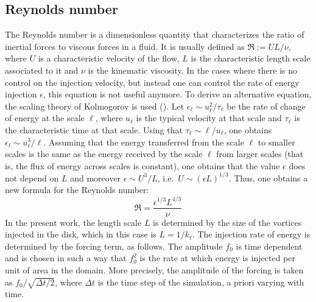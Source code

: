 \documentclass[../main.tex]{subfiles}
\begin{document}
\subsection{Reynolds number}
The Reynolds number is a dimensionless quantity that characterizes the ratio of inertial forces to viscous forces in a fluid. It is usually defined as $\Re:= U L/\nu$, where $U$ is a characteristic velocity of the flow, $L$ is the characteristic length scale associated to it and $\nu$ is the kinematic viscosity. In the cases where there is no control on the injection velocity, but instead one can control the rate of energy injection $\epsilon$, this equation is not useful anymore. To derive an alternative equation, the scaling theory of Kolmogorov is used (\cite{Frisch}). Let $\epsilon_\ell \sim u_\ell^2 / \tau_\ell$ be the rate of change of energy at the scale $\ell$, where $u_\ell$ is the typical velocity at that scale and $\tau_\ell$ is the characteristic time at that scale. Using that $\tau_\ell\sim \ell/u_\ell$, one obtains $\epsilon_\ell \sim u_\ell^3/\ell$. Assuming that the energy transferred from the scale $\ell$ to smaller scales is the same as the energy received by the scale $\ell$ from larger scales (that is, the flux of energy across scales is constant), one obtains that the value $\epsilon$ does not depend on $L$ and moreover $\epsilon \sim U^3/L$, i.e.\ $U \sim {(\epsilon L)}^{1/3}$. Thus, one obtains a new formula for the Reynolds number:
\begin{equation}
	\Re=\frac{\epsilon^{1/3} L^{4/3}}{\nu}
\end{equation}
In the present work, the length scale $L$ is determined by the size of the vortices injected in the disk, which in this case is $L=1/k_\ell$. The injection rate of energy is determined by the forcing term, as follows. The amplitude $f_0$ is time dependent and is chosen in such a way that $f_0^2$ is the rate at which energy is injected per unit of area in the domain. More precisely, the amplitude of the forcing is taken as $f_0/\sqrt{\Delta t/2}$, where $\Delta t$ is the time step of the simulation, a priori varying with time.
\end{document}
